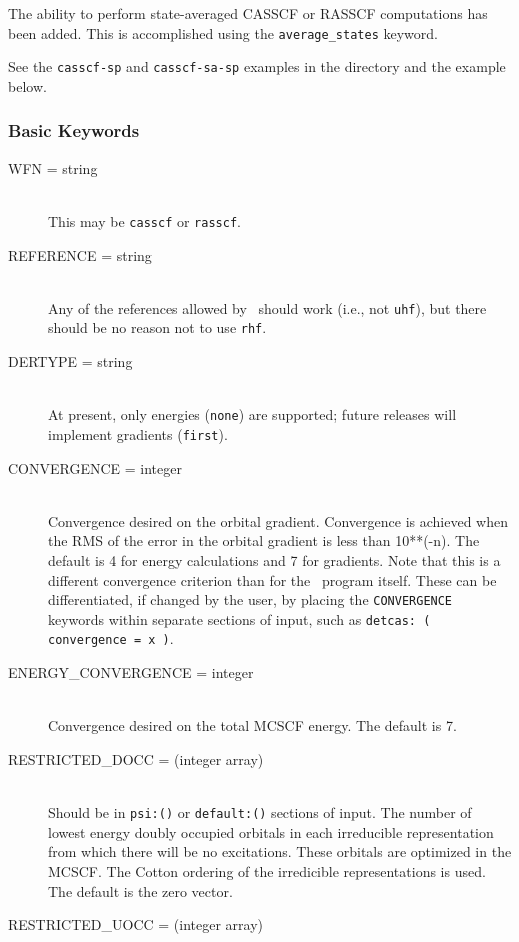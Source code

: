 The ability to perform state-averaged 
\cite{Docken:1972:4928,Ruedenberg:1979:1069}
CASSCF or RASSCF computations has been added.  This is accomplished using the 
{\tt average\_states} keyword.

See the {\tt casscf-sp} and {\tt casscf-sa-sp} examples in the 
 directory and the example below.

\subsubsection{Basic Keywords}
\begin{description}
\item[WFN = string]\mbox{}\\
This may be {\tt casscf} or {\tt rasscf}.
\item[REFERENCE = string]\mbox{}\\
Any of the references allowed by \PSIdetci\ should work (i.e., not 
{\tt uhf}), but there should be no reason not to use {\tt rhf}.
\item[DERTYPE = string]\mbox{}\\
At present, only energies ({\tt none}) are supported; future
releases will implement gradients ({\tt first}).
\item[CONVERGENCE = integer]\mbox{}\\
Convergence desired on the orbital gradient.  Convergence is achieved when
the RMS of the error in the orbital gradient is less than 10**(-n).  The 
default is 4 for energy calculations and 7 for gradients.  Note that
this is a different convergence criterion than for the \PSIdetci\
program itself.  These can be differentiated, if changed by the user,
by placing the {\tt CONVERGENCE} keywords within separate sections of
input, such as {\tt detcas: ( convergence = x )}.
\item[ENERGY\_CONVERGENCE = integer]\mbox{}\\
Convergence desired on the total MCSCF energy.  The default is 7.
\item[RESTRICTED\_DOCC = (integer array)]\mbox{}\\
Should be in {\tt psi:()} or {\tt default:()} sections of input.
The number of lowest energy doubly occupied orbitals in each irreducible
representation from which there will be no excitations.  
These orbitals are optimized in the MCSCF.
The Cotton ordering of the irredicible representations is used.
The default is the zero vector.
\item[RESTRICTED\_UOCC = (integer array)]\mbox{}\\

\end{description}
